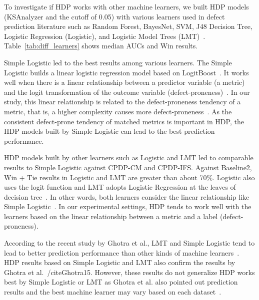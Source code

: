 To investigate if
HDP works with other machine learners, we built HDP models (KSAnalyzer and
the cutoff of 0.05) with various learners used in defect prediction
literature such as Random Forest, BayesNet, SVM, J48 Decision
Tree, Logistic Regression (Logistic),
and Logistic Model Trees
(LMT)~\cite{DAmbros12,Ghotra15,Lee11,Lessmann08,Nam13,Song11,Ghotra15}.
Table~\ref{tab:diff_learners} shows median AUCs and Win results.

Simple Logistic led to the best results among various
learners. The Simple Logistic builds a linear logistic regression model based on LogitBoost~\cite{Landwehr2005}. It works well when there is a linear
relationship between a predictor variable (a metric) and the logit
transformation of the outcome variable (defect-proneness)~\cite{Landwehr2005,Logstic}.
In our study, this linear relationship is related to the defect-proneness tendency of
a metric, that is, a higher complexity causes more defect-proneness~\cite{DAmbros12,Menzies07,Rahman13}.
As the consistent defect-prone tendency of matched metrics is important in HDP, the
HDP models built by Simple Logistic can lead to the best prediction
performance.

HDP models built by other learners such as
Logistic and LMT led to comparable results to Simple Logistic against
CPDP-CM and CPDP-IFS. Against Baseline2, Win + Tie results in
Logistic and LMT are greater than about 70\%.
Logistic also uses the logit function and LMT adopts Logistic
Regression at the leaves of decision tree~\cite{Ghotra15}. In other words, both
learners consider the linear relationship like Simple Logistic~\cite{Landwehr2005,Logstic}. In our experimental settings, HDP tends to
work well with the learners based on the linear relationship between a metric
and a label (defect-proneness).

According to the recent study by Ghotra et al., LMT and Simple Logistic tend to lead to better prediction performance than other kinds of machine learners~\cite{Ghotra15}. HDP results based on Simple Logistic and LMT also confirm the results by Ghotra et al.~/cite{Ghotra15}. However, these results do not generalize HDP works best by Simple Logistic or LMT as Ghotra et al. also pointed out prediction results and the best machine learner may vary based on each dataset~\cite{Ghotra15}.

